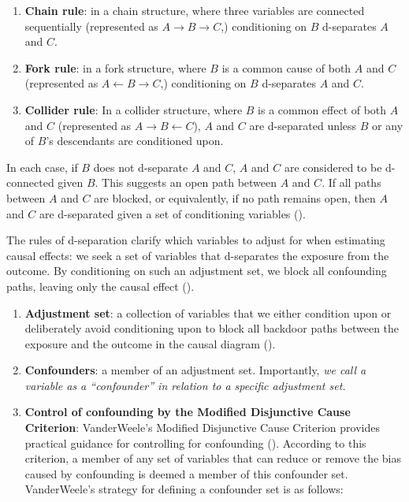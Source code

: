 \documentclass[
  singlecolumn]{article}
\begin{document}
\begin{enumerate}
\def\labelenumi{\alph{enumi}.}
\item
  \textbf{Chain rule}: in a chain structure, where three variables are
  connected sequentially (represented as
  \(A \rightarrow B \rightarrow C\),) conditioning on \(B\) d-separates
  \(A\) and \(C\).
\item
  \textbf{Fork rule}: in a fork structure, where \(B\) is a common cause
  of both \(A\) and \(C\) (represented as
  \(A \leftarrow B \rightarrow C\),) conditioning on \(B\) d-separates
  \(A\) and \(C\).
\item
  \textbf{Collider rule}: In a collider structure, where \(B\) is a
  common effect of both \(A\) and \(C\) (represented as
  \(A \rightarrow B \leftarrow C\)), \(A\) and \(C\) are d-separated
  unless \(B\) or any of \(B\)'s descendants are conditioned upon.
\end{enumerate}

In each case, if \(B\) does not d-separate \(A\) and \(C\), \(A\) and
\(C\) are considered to be d-connected given \(B\). This suggests an
open path between \(A\) and \(C\). If all paths between \(A\) and \(C\)
are blocked, or equivalently, if no path remains open, then \(A\) and
\(C\) are d-separated given a set of conditioning variables
().

The rules of d-separation clarify which variables to adjust for when
estimating causal effects: we seek a set of variables that d-separates
the exposure from the outcome. By conditioning on such an adjustment
set, we block all confounding paths, leaving only the causal effect
().

\begin{enumerate}
\def\labelenumi{\arabic{enumi}.}
\setcounter{enumi}{4}
\item
  \textbf{Adjustment set}: a collection of variables that we either
  condition upon or deliberately avoid conditioning upon to block all
  backdoor paths between the exposure and the outcome in the causal
  diagram ().
\item
  \textbf{Confounders}: a member of an adjustment set. Importantly,
  \emph{we call a variable as a ``confounder'' in relation to a specific
  adjustment set.}
\item
  \textbf{Control of confounding by the Modified Disjunctive Cause
  Criterion}: VanderWeele's Modified Disjunctive Cause Criterion
  provides practical guidance for controlling for confounding
  (). According to this
  criterion, a member of any set of variables that can reduce or remove
  the bias caused by confounding is deemed a member of this confounder
  set. VanderWeele's strategy for defining a confounder set is as
  follows:
\end{enumerate}
\end{document}
